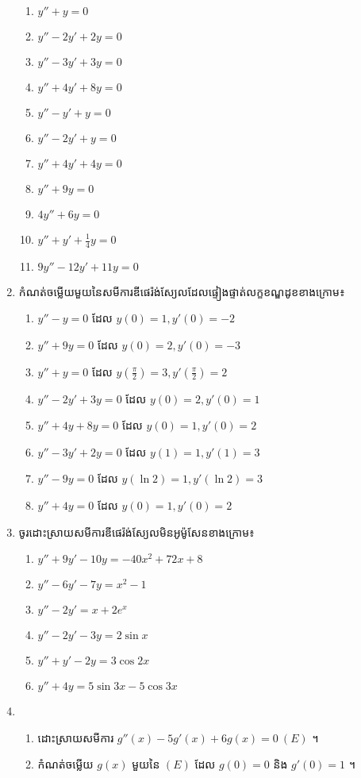 \documentclass[12pt, a4paper]{article}
\begin{document}
\begin{enumerate}[m]
\begin{enumerate}[k,2]
		\item $y''+y=0$
		\item $y''-2y'+2y=0$
		\item $y''-3y'+3y=0$
		\item $y''+4y'+8y=0$
		\item $y''-y'+y=0$
		\item $y''-2y'+y=0$
		\item $y''+4y'+4y=0$
		\item $y''+9y=0$
		\item $4y''+6y=0$
		\item $y''+y'+\frac{1}{4}y=0$
		\item $9y''-12y'+11y=0$
	\end{enumerate}
	\item កំណត់ចម្លើយមួយនៃសមីការឌីផេរ៉ង់ស្យែលដែលផ្ទៀងផ្ទាត់លក្ខខណ្ឌដូខខាងក្រោម៖
	\begin{enumerate}[k,2]
		\item $y''-y=0$ ដែល $y(0)=1,y'(0)=-2$
		\item $y''+9y=0$ ដែល $y(0)=2,y'(0)=-3$
		\item $y''+y=0$ ដែល $y\left(\frac{\pi}{2}\right)=3,y'\left(\frac{\pi}{2}\right)=2$
		\item $y''-2y'+3y=0$ ដែល $y(0)=2,y'(0)=1$
		\item $y''+4y+8y=0$ ដែល $y(0)=1,y'(0)=2$
		\item $y''-3y'+2y=0$ ដែល $y(1)=1,y'(1)=3$
		\item $y''-9y=0$ ដែល $y(\ln2)=1, y'(\ln2)=3$
		\item $y''+4y=0$ ដែល $y(0)=1,y'(0)=2$
	\end{enumerate}
	\item ចូរដោះស្រាយសមីការឌីផេរ៉ង់ស្យែលមិនអូម៉ូសែនខាងក្រោម៖
	\begin{enumerate}[k,2]
		\item $y''+9y'-10y=-40x^2+72x+8$
		\item $y''-6y'-7y=x^2-1$
		\item $y''-2y'=x+2e^x$
		\item $y''-2y'-3y=2\sin x$
		\item $y''+y'-2y=3\cos2x$
		\item $y''+4y=5\sin3x-5\cos3x$
	\end{enumerate}
	\item \begin{enumerate}[k]
		\item ដោះស្រាយសមីការ $g''(x)-5g'(x)+6g(x)=0~(E)$ ។
		\item កំណត់ចម្លើយ $g(x)$ មួយនៃ $(E)$ ដែល $g(0)=0$ និង $g'(0)=1$ ។

\end{enumerate}
\end{enumerate}
\end{document}
